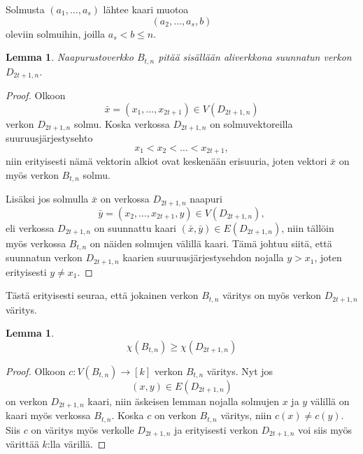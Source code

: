 \documentclass[finnish]{tktltiki2}
\newtheorem{lem}[lau]{Lemma}
\theoremstyle{definition}
\theoremstyle{remark}
\newcommand{\from}{\colon}
\begin{document}
Solmusta $(a_1,\dots,a_s)$ lähtee kaari muotoa
%
\begin{equation*}
    (a_2,\dots,a_s,b)
\end{equation*}
%
oleviin solmuihin, joilla $a_s < b \leq n$.

\begin{lem}
    Naapurustoverkko $B_{t,n}$ pitää sisällään aliverkkona suunnatun verkon
    $D_{2t+1,n}$.
\end{lem}

\newcommand{\D}{D_{2t+1,n}}
\newcommand{\Btn}{B_{t,n}}
\begin{proof}
    Olkoon
    \begin{equation*}
        \bar{x} = (x_1, \dots, x_{2t+1}) \in V(\D)
    \end{equation*}
    verkon $\D$ solmu.  Koska verkossa $\D$ on solmuvektoreilla
    suuruusjärjestysehto
    \begin{equation*}
        x_1 < x_2 < \dots < x_{2t+1},
    \end{equation*}
    niin erityisesti nämä vektorin alkiot ovat keskenään erisuuria, joten
    vektori $\bar{x}$ on myös verkon $\Btn$ solmu.

    Lisäksi jos solmulla $\bar{x}$ on verkossa $\D$ naapuri
    \begin{equation*}
            \bar{y} = (x_2, \dots, x_{2t+1}, y) \in V(\D),
    \end{equation*}
    eli verkossa $\D$ on suunnattu kaari $(\bar{x},\bar{y}) \in E(\D)$, niin
    tällöin myös verkossa $\Btn$ on näiden solmujen välillä kaari. Tämä
    johtuu siitä, että suunnatun verkon $\D$ kaarien suuruusjärjestysehdon
    nojalla $y > x_1$, joten erityisesti $y \neq x_1$.
\end{proof}

Tästä erityisesti seuraa, että jokainen verkon $\Btn$ väritys on myös verkon
$\D$ väritys.

\begin{lem}
    \begin{equation*}
        \chi(\Btn) \geq \chi(\D)
    \end{equation*}
\end{lem}

\begin{proof}
    Olkoon $c \from V(\Btn) \to [k]$ verkon $\Btn$ väritys. Nyt jos
    \begin{equation*}
            (x,y) \in E(\D)
    \end{equation*}
    on verkon $\D$ kaari, niin äskeisen lemman nojalla solmujen $x$ ja
    $y$ välillä on kaari myös verkossa $\Btn$. Koska $c$ on verkon $\Btn$
    väritys, niin $c(x) \neq c(y)$. Siis $c$ on väritys myös verkolle $\D$ ja
    erityisesti verkon $\D$ voi siis myös värittää $k$:lla värillä.
\end{proof}
\end{document}

